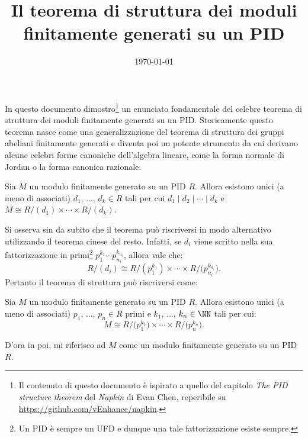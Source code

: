 \documentclass[12pt]{scrartcl}
\begin{document}
	\title{Il teorema di struttura dei moduli finitamente generati su un PID}
	\date{\today}
	\maketitle
	
	In questo documento dimostro\footnote{
		Il contenuto di questo documento è ispirato a quello
		del capitolo \textit{The PID structure theorem} del
		\textit{Napkin} di Evan Chen, reperibile su
		\url{https://github.com/vEnhance/napkin}.	
	} un enunciato fondamentale del celebre teorema
	di struttura dei moduli finitamente generati su un PID.
	Storicamente questo teorema nasce come una generalizzazione
	del teorema di struttura dei gruppi abeliani finitamente generati e diventa
	poi un potente strumento da cui derivano alcune celebri forme canoniche
	dell'algebra lineare, come la forma normale di Jordan o la forma
	canonica razionale.
	
	\begin{theorem}
		Sia $M$ un modulo finitamente generato su un PID $R$. Allora
		esistono unici (a meno di associati) $d_1$, ..., $d_k \in R$
		tali per cui $d_1 \mid d_2 \mid \cdots \mid d_k$ e
		$M \cong R/(d_1) \times \cdots \times R/(d_k)$.
	\end{theorem}

	Si osserva sin da subito che il teorema può riscriversi in modo alternativo
	utilizzando il teorema cinese del resto. Infatti, se $d_i$ viene
	scritto nella sua fattorizzazione in primi\footnote{
		Un PID è sempre un UFD e dunque una tale fattorizzazione esiste sempre.
	} $p_1^{k_1} \cdots p_{n_i}^{k_{n_i}}$, allora vale che:
	\[
		R/(d_i) \cong R/\!\left(p_1^{k_1}\right) \times \cdots \times R/\bigl(p_{n_i}^{k_{n_i}}\bigr).
	\]
	Pertanto il teorema di struttura può riscriversi come:
	
	\begin{theorem}
		Sia $M$ un modulo finitamente generato su un PID $R$. Allora
		esistono unici (a meno di associati) $p_1$, ..., $p_n \in R$ primi
		e $k_1$, ..., $k_n \in \NN$ tali per cui:
		\[
			M \cong R/\bigl(p_1^{k_1}\bigr) \times \cdots \times R/\bigl(p_n^{k_n}\bigr).
		\]
	\end{theorem}
	
	\begin{remark}
		D'ora in poi, mi riferisco ad $M$ come un modulo finitamente generato
		su un PID $R$. 
	\end{remark}
	
\end{document}
